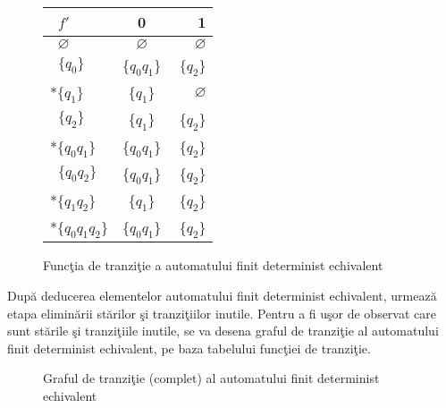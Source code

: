 \begin{figure}[H]
\centering
\begin{tabular}{ l | c |  r }
      $\;\;f'$     &            0   &            1\\
   \hline
      $\;\;\varnothing$  & $\varnothing$   & $\varnothing$\\
      $\;\;\{q_{0}\}$  &\{$q_{0} q_{1}$\}  & $\;\{q_{2}$\}\\
     *$\{q_{1}\}$    & \{$q_{1}$\} & $\varnothing$\\
      $\;\;\{q_{2}\}$ & \{$q_{1}$\} & \{$q_{2}$\}\\
     *$\{q_{0} q_{1}\}$    &    \{$q_{0} q_{1}$\}          &             \{$q_{2}$\}\\
      $\;\;\{q_{0} q_{2}\}$    &	 \{$q_{0} q_{1}$\}	&	  \{$q_{2}$\}\\
     *$\{q_{1} q_{2}\}$    &    \{$q_{1}$\}          &             \{$q_{2}$\}\\
     *$\{q_{0} q_{1} q_{2}\}$    &    \{$q_{0} q_{1}$\}          &             \{$q_{2}$\}\\
      
\end{tabular}
\caption{Funcţia de tranziţie a automatului finit determinist echivalent}
\end{figure}

După deducerea elementelor automatului finit determinist echivalent, urmează etapa eliminării stărilor şi tranziţiilor inutile. Pentru a fi uşor de observat care sunt stările şi tranziţiile inutile, se va desena graful de tranziţie al automatului finit determinist echivalent, pe baza tabelului funcţiei de tranziţie.

\begin{figure}[H]
\centering
{}
\caption{Graful de tranziţie (complet) al automatului finit determinist echivalent}
\end{figure}

